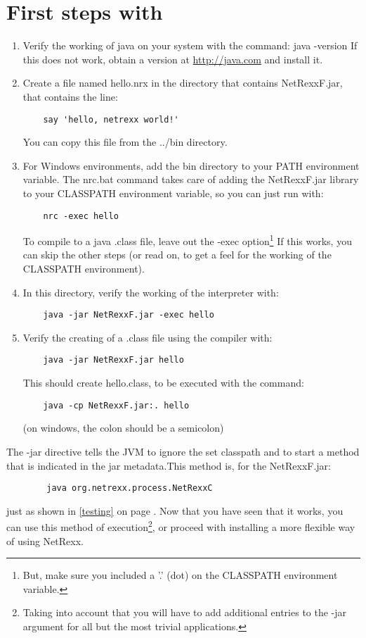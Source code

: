 \section{First steps with \nr{}}
\begin{enumerate}
\item Verify the working of java on your system with the command:
	java -version\newline
If this does not work, obtain a version at \url{http://java.com} and install it.

\item Create a file named hello.nrx in the directory that contains
  NetRexxF.jar, that contains  the line:
\begin{lstlisting}
	say 'hello, netrexx world!'
\end{lstlisting}
You can copy this file from the ../bin directory.
\item For Windows environments, add the bin directory to your PATH
  environment variable. The nrc.bat command takes care of adding the
  NetRexxF.jar library to your CLASSPATH environment variable,  so you
  can just run with:
\begin{lstlisting}
	nrc -exec hello
\end{lstlisting}
To compile to a java .class file, leave out the -exec
option\footnote{But, make sure you included a '.' (dot) on the
  CLASSPATH environment variable.} If this
works, you can skip the other steps (or read on, to get a feel for the
working of the CLASSPATH environment).
\item In this directory, verify the working of the interpreter with:
\begin{lstlisting}
	java -jar NetRexxF.jar -exec hello
\end{lstlisting}
\item Verify the creating of a .class file using the compiler with:
\begin{lstlisting}
	java -jar NetRexxF.jar hello
\end{lstlisting}
This should create hello.class, to be executed with the command:
\begin{lstlisting}
	java -cp NetRexxF.jar:. hello
\end{lstlisting}
(on windows, the colon should be a semicolon)
\end{enumerate}
The -jar directive tells the JVM to ignore the set classpath and to
start a method that is indicated in the jar metadata.This method is,
for the NetRexxF.jar: 
 \begin{lstlisting}
        java org.netrexx.process.NetRexxC
\end{lstlisting}
just as shown in \ref{testing} on page \pageref{testing}. Now that you
have seen that it works, you can use this method of
execution\footnote{Taking into account that you will have to add
  additional entries to the -jar argument for all but the most trivial
applications.}, or
proceed with installing a more flexible way of using NetRexx.

